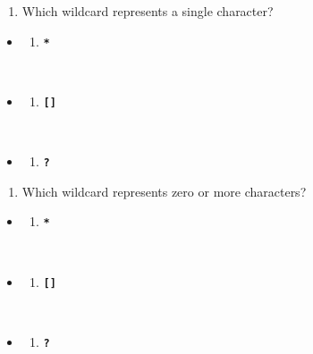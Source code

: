 \documentclass[
  letterpaper,
  DIV=11,
  numbers=noendperiod]{scrreprt}
\providecommand{\tightlist}{%
  \setlength{\itemsep}{0pt}\setlength{\parskip}{0pt}}
\begin{document}
\begin{enumerate}
\def\labelenumi{\arabic{enumi}.}
\setcounter{enumi}{3}
\tightlist
\item
  Which wildcard represents a single character?
\end{enumerate}

\begin{itemize}
\tightlist
\item
  \begin{enumerate}
  \def\labelenumi{(\Alph{enumi})}
  \tightlist
  \item
    \textbf{\texttt{*}}\strut \\
  \end{enumerate}
\item
  \begin{enumerate}
  \def\labelenumi{(\Alph{enumi})}
  \setcounter{enumi}{1}
  \tightlist
  \item
    \textbf{\texttt{{[}{]}}}\strut \\
  \end{enumerate}
\item
  \begin{enumerate}
  \def\labelenumi{(\Alph{enumi})}
  \setcounter{enumi}{2}
  \tightlist
  \item
    \textbf{\texttt{?}}
  \end{enumerate}
\end{itemize}

\begin{enumerate}
\def\labelenumi{\arabic{enumi}.}
\setcounter{enumi}{4}
\tightlist
\item
  Which wildcard represents zero or more characters?
\end{enumerate}

\begin{itemize}
\tightlist
\item
  \begin{enumerate}
  \def\labelenumi{(\Alph{enumi})}
  \tightlist
  \item
    \textbf{\texttt{*}}\strut \\
  \end{enumerate}
\item
  \begin{enumerate}
  \def\labelenumi{(\Alph{enumi})}
  \setcounter{enumi}{1}
  \tightlist
  \item
    \textbf{\texttt{{[}{]}}}\strut \\
  \end{enumerate}
\item
  \begin{enumerate}
  \def\labelenumi{(\Alph{enumi})}
  \setcounter{enumi}{2}
  \tightlist
  \item
    \textbf{\texttt{?}}
  \end{enumerate}
\end{itemize}
\end{document}
